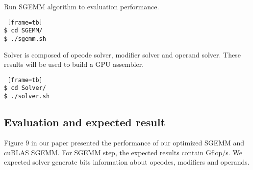 Run SGEMM algorithm to evaluation performance.
\begin{lstlisting} [frame=tb]
$ cd SGEMM/
$ ./sgemm.sh
\end{lstlisting}

Solver is composed of opcode solver, modifier solver and operand solver. 
These results will be used to build a GPU assembler.
\begin{lstlisting} [frame=tb]
$ cd Solver/
$ ./solver.sh
\end{lstlisting}

\subsection{Evaluation and expected result}
Figure $9$ in our paper presented the performance of our optimized SGEMM and cuBLAS SGEMM. For SGEMM step, the expected results contain Gflop/s. We expected solver generate bits information about opcodes, modifiers and operands.

